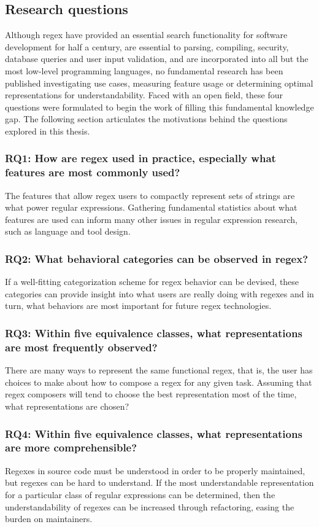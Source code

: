 \subsection{Research questions}

Although regex have provided an essential search functionality for software development for half a century, are essential to parsing, compiling, security, database queries and user input validation, and are incorporated into all but the most low-level programming languages, no fundamental research has been published investigating use cases, measuring feature usage or determining optimal representations for understandability.  Faced with an open field, these four questions were formulated to begin the work of filling this fundamental knowledge gap.  The following section articulates the motivations behind the questions explored in this thesis.

\subsubsection{RQ1: How are regex used in practice, especially what features are most commonly used?}

The features that allow regex users to compactly represent sets of strings are what power regular expressions.  Gathering fundamental statistics about what features are used can inform many other issues in regular expression research, such as language and tool design.

\subsubsection{RQ2: What behavioral categories can be observed in regex?}

If a well-fitting categorization scheme for regex behavior can be devised, these categories can provide insight into what users are really doing with regexes and in turn, what behaviors are most important for future regex technologies.

\subsubsection{RQ3: Within five equivalence classes, what representations are most frequently observed?}

There are many ways to represent the same functional regex, that is, the user has choices to make about how to compose a regex for any given task.  Assuming that regex composers will tend to choose the best representation most of the time, what representations are chosen?

\subsubsection{RQ4: Within five equivalence classes, what representations are more comprehensible?}

Regexes in source code must be understood in order to be properly maintained, but regexes can be hard to understand.  If the most understandable representation for a particular class of regular expressions can be determined, then the understandability of regexes can be increased through refactoring, easing the burden on maintainers.
